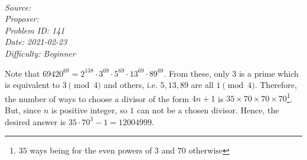 
\SSbreak\\
\emph{Source: \Cop}\\
\emph{Proposer: \Pnjoy}\\
\emph{Problem ID: 141}\\
\emph{Date: 2021-02-23}\\
\emph{Difficulty: Beginner}\\
\SSbreak

\bigskip

\begin{solution}\hfil\medskip

  Note that $69420^{69}=2^{138}\cdot 3^{69}\cdot 5^{69}\cdot 13^{69}\cdot 89^{69}$. From these, only $3$ is a prime which is equivalent to $3 \pmod{4}$ and others, i.e. $5, 13, 89$ are all $1\pmod{4}$. Therefore, the number of ways to choose a divisor of the form $4n+1$ is $35 \times 70\times 70\times 70$\footnote{$35$ ways being for the even powers of $3$ and $70$ otherwise}. But, since $n$ is positive integer, so $1$ can not be a chosen divisor. Hence, the desired answer is $35\cdot 70^3 - 1 = \boxed{12004999}$.
\end{solution}\bigskip
